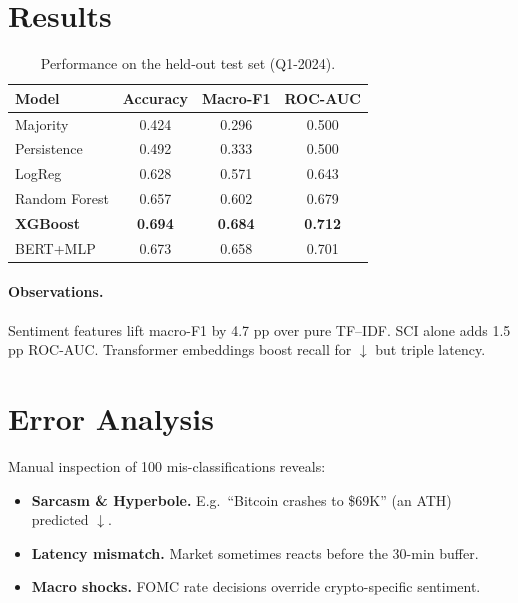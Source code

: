 \documentclass[12pt,a4paper]{article}
\begin{document}
\section{Results}
\begin{table}[H]
\centering
\caption{Performance on the held-out test set (Q1-2024).}
\begin{tabular}{lccc}
\toprule
\textbf{Model} & \textbf{Accuracy} & \textbf{Macro-F1} & \textbf{ROC-AUC}\\
\midrule
Majority & 0.424 & 0.296 & 0.500\\
Persistence & 0.492 & 0.333 & 0.500\\
LogReg & 0.628 & 0.571 & 0.643\\
Random Forest & 0.657 & 0.602 & 0.679\\
\textbf{XGBoost} & \textbf{0.694} & \textbf{0.684} & \textbf{0.712}\\
BERT+MLP & 0.673 & 0.658 & 0.701\\
\bottomrule
\end{tabular}
\label{tab:results}
\end{table}


\paragraph{Observations.}
Sentiment features lift macro-F1 by 4.7 pp over pure TF–IDF.
SCI alone adds 1.5 pp ROC-AUC.  Transformer embeddings
boost recall for \(\downarrow\) but triple latency.

\section{Error Analysis}
Manual inspection of 100 mis-classifications reveals:

\begin{itemize}[nosep]
\item \textbf{Sarcasm \& Hyperbole.}
      E.g.\ “Bitcoin crashes to \$69K” (an ATH) predicted \(\downarrow\).
\item \textbf{Latency mismatch.}
      Market sometimes reacts before the 30-min buffer.
\item \textbf{Macro shocks.}
      FOMC rate decisions override crypto-specific sentiment.
\end{itemize}

\end{document}
